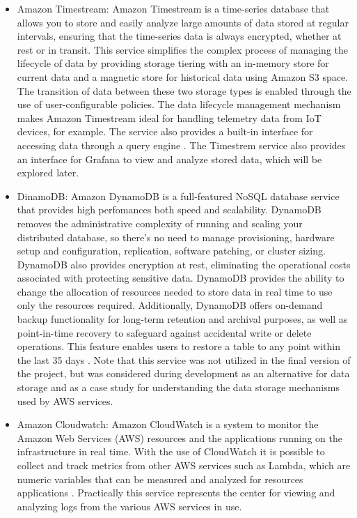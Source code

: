 \begin{itemize}
\begin{figure}[h]
        \label{fig:AmazonKinesis}
    \end{figure}
    \item Amazon Timestream: Amazon Timestream is a time-series database that allows you to store and easily analyze large amounts of data stored at regular intervals, ensuring that the time-series data is always encrypted, whether at rest or in transit. This service simplifies the complex process of managing the lifecycle of data by providing storage tiering with an in-memory store for current data and a magnetic store for historical data using Amazon S3 space. The transition of data between these two storage types is enabled through the use of user-configurable policies. The data lifecycle management mechanism makes Amazon Timestream ideal for handling telemetry data from IoT devices, for example. The service also provides a built-in interface for accessing data through a query engine \cite{AWSTimestream}. The Timestrem service also provides an interface for Grafana to view and analyze stored data, which will be explored later.
    \item DinamoDB: Amazon DynamoDB is a full-featured NoSQL database service that provides high perfomances both speed and scalability. DynamoDB removes the administrative complexity of running and scaling your distributed database, so there's no need to manage provisioning, hardware setup and configuration, replication, software patching, or cluster sizing. DynamoDB also provides encryption at rest, eliminating the operational costs associated with protecting sensitive data. DynamoDB provides the ability to change the allocation of resources needed to store data in real time to use only the resources required. Additionally, DynamoDB offers on-demand backup functionality for long-term retention and archival purposes, as well as point-in-time recovery to safeguard against accidental write or delete operations. This feature enables users to restore a table to any point within the last 35 days \cite{AWSDynamoDB}. Note that this service was not utilized in the final version of the project, but was considered during development as an alternative for data storage and as a case study for understanding the data storage mechanisms used by AWS services.
    \item Amazon Cloudwatch: Amazon CloudWatch is a system to monitor the Amazon Web Services (AWS) resources and the applications running on the infrastructure in real time. With the use of CloudWatch it is possible to collect and track metrics from other AWS services such as Lambda, which are numeric variables that can be measured and analyzed for resources applications \cite{AWSCloudwatch}. Practically this service represents the center for viewing and analyzing logs from the various AWS services in use.
\end{itemize}

